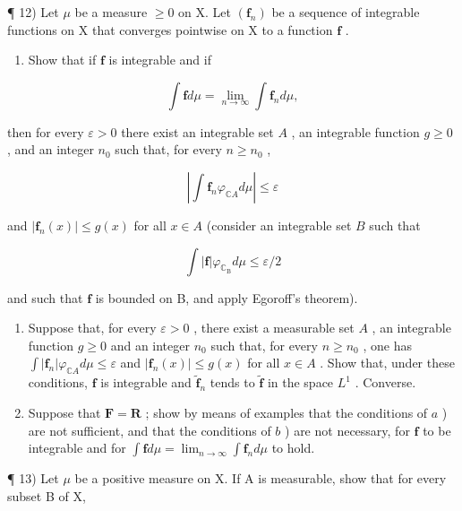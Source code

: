 ¶ 12) Let \(\mu\) be a measure \(\geqslant 0\) on X. Let \((\mathbf{f}_n)\) be a sequence of integrable functions on X that converges pointwise on X to a function \(\mathbf{f}\) .

\begin{enumerate}
\def\labelenumi{\alph{enumi})}
\tightlist
\item
  Show that if \(\mathbf{f}\) is integrable and if
\end{enumerate}

\[
\int \mathbf {f} d \mu = \lim _ {n \rightarrow \infty} \int \mathbf {f} _ {n} d \mu ,
\]

then for every \(\varepsilon > 0\) there exist an integrable set \(A\) , an integrable function \(g \geqslant 0\) , and an integer \(n_0\) such that, for every \(n \geqslant n_0\) ,

\[
\left| \int \mathbf {f} _ {n} \varphi_ {\mathbb {C} A} d \mu \right| \leqslant \varepsilon
\]

and \(|\mathbf{f}_n(x)| \leqslant g(x)\) for all \(x \in A\) (consider an integrable set \(B\) such that

\[
\int | \mathbf {f} | \varphi_ {\mathbb {C} _ {\mathrm{B}}} d \mu \leqslant \varepsilon / 2
\]

and such that \(\mathbf{f}\) is bounded on B, and apply Egoroff's theorem).

\begin{enumerate}
\def\labelenumi{\alph{enumi})}
\setcounter{enumi}{1}
\item
  Suppose that, for every \(\varepsilon > 0\) , there exist a measurable set \(A\) , an integrable function \(g \geqslant 0\) and an integer \(n_0\) such that, for every \(n \geqslant n_0\) , one has \(\int |\mathbf{f}_n| \varphi_{\mathbb{C}A} d\mu \leqslant \varepsilon\) and \(|\mathbf{f}_n(x)| \leqslant g(x)\) for all \(x \in A\) . Show that, under these conditions, \(\mathbf{f}\) is integrable and \(\widetilde{\mathbf{f}}_n\) tends to \(\widetilde{\mathbf{f}}\) in the space \(L^1\) . Converse.
\item
  Suppose that \(\mathbf{F} = \mathbf{R}\) ; show by means of examples that the conditions of \(a\) ) are not sufficient, and that the conditions of \(b\) ) are not necessary, for \(\mathbf{f}\) to be integrable and for \(\int \mathbf{f} d\mu = \lim_{n \to \infty} \int \mathbf{f}_n d\mu\) to hold.
\end{enumerate}

¶ 13) Let \(\mu\) be a positive measure on X. If A is measurable, show that for every subset B of X,

